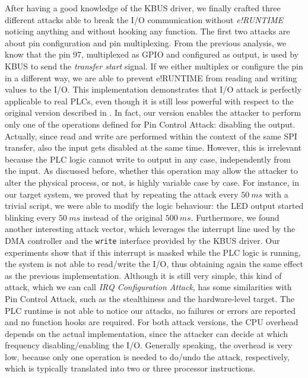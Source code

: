 After having a good knowledge of the KBUS driver, we finally crafted three different attacks able to break the I/O communication without \emph{e!RUNTIME}
noticing anything and without hooking any function. The first two attacks are about pin configuration and pin multiplexing.
From the previous analysis, we know that the pin 97, multiplexed as GPIO and configured as output, is used by KBUS to send the \emph{transfer start} signal.
If we either multiplex or configure the pin in a different way, we are able to prevent e!RUNTIME from reading and writing values to the I/O.
This implementation demonstrates that I/O attack is perfectly applicable to real PLCs, even though it is still less powerful with respect to the
original version described in . In fact, our version enables the attacker to perform only one of the operations defined for Pin Control Attack:
disabling the output. Actually, since read and write are performed within the context of the same SPI transfer, also the input gets disabled at the same time.
However, this is irrelevant because the PLC logic cannot write to output in any case, independently from the input.
As discussed before, whether this operation may allow the attacker to alter the physical process, or not, is highly variable case by case.
For instance, in our target system, we proved that by repeating the attack every $\SI{50}{ms}$ with a trivial script, we were able to modify the logic behaviour:
the LED output started blinking every $\SI{50}{ms}$ instead of the original $\SI{500}{ms}$.
Furthermore, we found another interesting attack vector, which leverages the interrupt line used by the DMA controller and the \verb|write| interface provided by the KBUS driver.
Our experiments show that if this interrupt is masked while the PLC logic is running, the system is not able to read/write the I/O,
thus obtaining again the same effect as the previous implementation. Although it is still very simple, this kind of attack, which we can call \emph{IRQ Configuration Attack},
has some similarities with Pin Control Attack, such as the stealthiness and the hardware-level target.
The PLC runtime is not able to notice our attacks, no failures or errors are reported and no function hooks are required.
For both attack versions, the CPU overhead depends on the actual implementation, since the attacker can decide at which frequency disabling/enabling the I/O.
Generally speaking, the overhead is very low, because only one operation is needed to do/undo the attack, respectively, which is typically translated into two or three
processor instructions.

